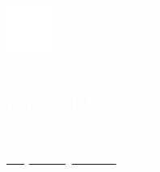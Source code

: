 \documentclass[../main.tex]{subfiles}
\begin{document}
    \hspace*{0.2cm}
    \begin{minipage}[t]{2cm}
        \vspace*{0.5cm}\includegraphics[width=1.5cm]{assets/contact.png}
    \end{minipage}
    \begin{minipage}[t]{5cm}
        \vspace*{0.5cm}

        \section*{\textcolor{white}{CONTACTE}}
        \vspace*{-0.25cm}
        \textcolor{white}{
            +34 660810737 \\
            \underline{\href{mailto:talayaalba@gmail.com}{\textcolor{white}{talayaalba@gmail.com}}}
        }
    \end{minipage}
\end{document}
